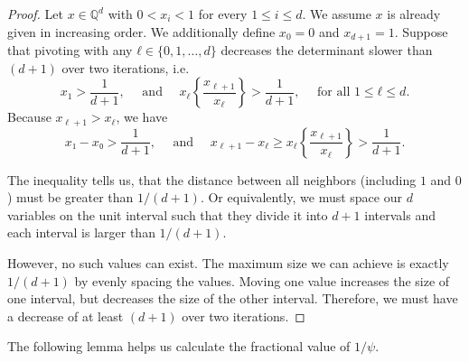 \begin{proof}
  Let $x ∈ ℚ^d$ with $0 < x_i < 1$ for every $1 ≤ i ≤ d$.
  We assume $x$ is already given in increasing order.
  We additionally define $x_0 = 0$ and $x_{d+1} = 1$.
  Suppose that pivoting with any $ℓ ∈ \{0, 1, \dots, d\}$
  decreases the determinant slower than $(d+1)$ over two iterations,
  i.e.
  \[
    x_1 > \frac{1}{d+1},
    \quad \text{ and } \quad
    x_\ell \left\{\frac{x_{\ell+1}}{x_\ell}\right\} > \frac{1}{d+1}, \quad \text{ for all } 1 ≤ ℓ ≤ d.
  \]
  Because $x_{\ell+1} > x_\ell$, we have
  \[
    x₁ - x₀ > \frac{1}{d+1},
    \quad \text{ and } \quad
    x_{\ell+1} - x_\ell ≥ x_\ell \left\{\frac{x_{\ell+1}}{x_\ell}\right\} > \frac{1}{d+1}.
  \]

  The inequality tells us, that the distance between all neighbors
  (including $1$ and $0$) must be greater than $1/(d+1)$.
  Or equivalently, we must space our $d$ variables on the unit interval such that they
  divide it into $d+1$ intervals and each interval is larger than $1/(d+1)$.

  {\begin{center}
  \end{center}}

  However, no such values can exist.
  The maximum size we can achieve is exactly $1/(d+1)$ by evenly
  spacing the values.
  Moving one value increases the size of one interval, but decreases the size
  of the other interval.
  Therefore, we must have a decrease of at least $(d+1)$ over two iterations.
\end{proof}

The following lemma helps us calculate the fractional value of $1/ψ$.

